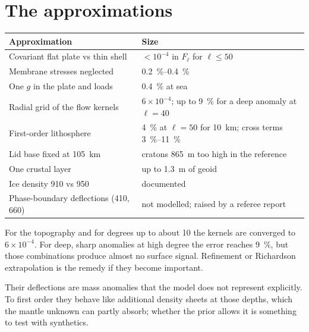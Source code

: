 \section{The approximations}

\begin{center}
\begin{longtable}{p{}p{}}
\toprule
Approximation & Size\\
\midrule
\endhead
Covariant flat plate vs thin shell & $<10^{-4}$ in $F_\ell$ for $\ell\le50$\\
Membrane stresses neglected & \qtyrange{0.2}{0.4}{\percent}\\
One $g$ in the plate and loads & \qty{0.4}{\percent} at sea\\
Radial grid of the flow kernels & $6\times10^{-4}$; up to \qty{9}{\percent} for a deep anomaly at $\ell=40$\\
First-order lithosphere & \qty{4}{\percent} at $\ell=50$ for \qty{10}{km}; cross terms \qtyrange{3}{11}{\percent}\\
Lid base fixed at \qty{105}{km} & cratons \qty{+865}{m} too high in the reference\\
One crustal layer & up to \qty{1.3}{m} of geoid\\
Ice density 910 vs 950 & documented\\
Phase-boundary deflections (410, 660) & not modelled; raised by a referee report\\
\bottomrule
\end{longtable}
\end{center}

\begin{defence}
\A For the topography and for degrees up to about 10 the kernels are converged to $6\times10^{-4}$.
For deep, sharp anomalies at high degree the error reaches \qty{9}{\percent}, but those combinations produce almost no surface signal.
Refinement or Richardson extrapolation is the remedy if they become important.

\A Their deflections are mass anomalies that the model does not represent explicitly.
To first order they behave like additional density sheets at those depths, which the mantle unknown can partly absorb; whether the prior allows it is something to test with synthetics.
\end{defence}
